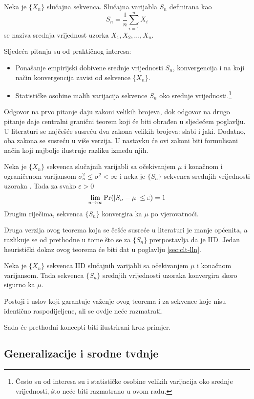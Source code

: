 \begin{definition}

  Neka je $\{X_n\}$ slučajna sekvenca. Slučajna varijabla $S_n$
  definirana kao 
  \begin{equation} \label{eq:sample-mean}
    S_n = \frac{1}{n} \sum_{i=1}^{n} X_i
  \end{equation}
  se naziva srednja vrijednost uzorka $X_1,X_2,...,X_n$.

\end{definition}
%
Sljedeća pitanja su od praktičnog interesa:

\begin{itemize}
  \item Ponašanje empirijski dobivene srednje vrijednosti $S_n$, konvergencija i
    na koji način konvergencija zavisi od sekvence $\{X_n\}$.
  \item Statističke osobine malih varijacija sekvence $S_n$ oko srednje
    vrijednosti.\footnote{Često su od interesa su i statističke osobine velikih
    varijacija oko srednje vrijednosti, što neće biti razmatrano u ovom radu.}
\end{itemize}

Odgovor na prvo pitanje daju zakoni velikih brojeva, dok odgovor na drugo
pitanje daje centralni granični teorem koji će biti obrađen u sljedećem
poglavlju. U literaturi se najčešće susreću dva zakona velikih brojeva: slabi i
jaki. Dodatno, oba zakona se susreću u više verzija. U nastavku će ovi zakoni
biti formulisani način koji najbolje ilustruje razliku između njih.

\begin{theorem}
  Neka je $\{X_n\}$ sekvenca slučajnih varijabli sa očekivanjem $\mu$ i konačnom
  i ograničenom varijansom $\sigma_n^2 \le \sigma^2 < \infty$ i neka je
  $\{S_n\}$ sekvenca srednjih vrijednosti uzoraka . Tada za svako
  $\varepsilon>0$
  \begin{equation}
    \lim_{n\to\infty} \mathrm{Pr}(|S_n - \mu| \le \varepsilon) = 1
  \end{equation}
  Drugim riječima, sekvenca $\{S_n\}$ konvergira ka $\mu$ po vjerovatnoći.
\end{theorem}
Druga verzija ovog teorema koja se češće susreće u literaturi je manje općenita,
a razlikuje se od prethodne u tome što se za $\{S_n\}$ pretpostavlja da je IID.
Jedan heuristički dokaz ovog teorema će biti dat u poglavlju \ref{sec:clt-lln}.

\begin{theorem}
  Neka je $\{X_n\}$ sekvenca IID slučajnih varijabli sa očekivanjem $\mu$ i
  konačnom varijansom. Tada sekvenca $\{S_n\}$ srednjih vrijednosti uzoraka
  konvergira skoro sigurno ka $\mu$.
\end{theorem}

Postoji i uslov koji garantuje važenje ovog teorema i za sekvence koje nisu
identično raspodijeljene, ali se ovdje neće razmatrati.

Sada će prethodni koncepti biti ilustrirani kroz primjer.

\subsection{Generalizacije i srodne tvdnje}

